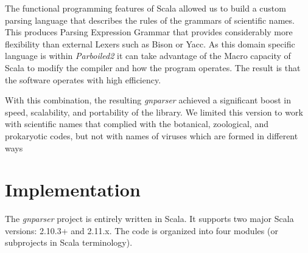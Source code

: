 \documentclass{bmcart}
\begin{document}
The functional programming features of Scala allowed us to build a custom parsing language that describes the rules of the grammars of scientific names. This produces Parsing Expression Grammar that provides considerably more flexibility than external Lexers such as Bison or Yacc. As this domain specific language is within \textit{Parboiled2} it can take advantage of the Macro capacity of Scala \cite{Burmako:2013:SML:2489837.2489840} to modify the compiler and how the program operates. The result is that the software operates with high efficiency. 

With this combination, the resulting \textit{gnparser} achieved a significant
boost in speed, scalability, and portability of the library.  We limited this
version to work with scientific names that complied with the botanical,
zoological, and prokaryotic codes, but not with names of viruses which are
formed in different ways \cite{ICTV, Patterson:inpress-a}

\section*{Implementation}

The \textit{gnparser} project is entirely written in Scala. It supports two
major Scala versions: 2.10.3+ and 2.11.x. The code is organized into four modules (or subprojects in Scala terminology).
\end{document}
